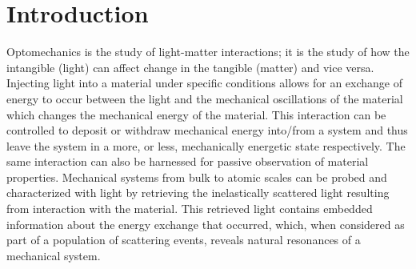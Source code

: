 \chapter{Introduction}
\label{ch:Introduction}
\acresetall



Optomechanics is the study of light-matter interactions; it is the study of how the intangible (light) can affect change in the tangible (matter) and vice versa. Injecting light into a material under specific conditions allows for an exchange of energy to occur between the light and the mechanical oscillations of the material which changes the mechanical energy of the material. This interaction can be controlled to deposit or withdraw mechanical energy into/from a system and thus leave the system in a more, or less, mechanically energetic state respectively. The same interaction can also be harnessed for passive observation of material properties. Mechanical systems from bulk to atomic scales can be probed and characterized with light by retrieving the inelastically scattered light resulting from interaction with the material. This retrieved light contains embedded information about the energy exchange that occurred, which, when considered as part of a population of scattering events, reveals natural resonances of a mechanical system.

